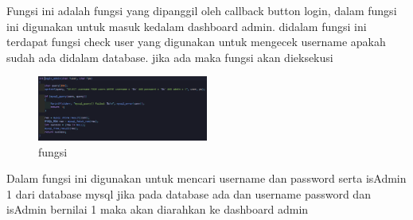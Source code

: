 \documentclass[a4paper,12pt]{article}
\begin{document}
\FloatBarrier
Fungsi ini adalah fungsi yang dipanggil oleh callback button login, dalam fungsi ini digunakan untuk masuk kedalam dashboard admin. didalam fungsi ini terdapat
fungsi check user yang digunakan untuk mengecek username apakah sudah ada didalam database. jika ada maka fungsi \texttt{} akan dieksekusi
\begin{figure}[!htbp]
    \centering
    \includegraphics[width=0.5\textwidth]{./img/login_admin/login_mysql.png}
    \caption{fungsi \texttt{}}
\end{figure}
\FloatBarrier
Dalam fungsi \texttt{} ini digunakan untuk mencari username dan password serta isAdmin 1 dari database mysql 
jika pada database ada dan username password dan isAdmin bernilai 1 maka akan diarahkan ke dashboard admin
\end{document}
